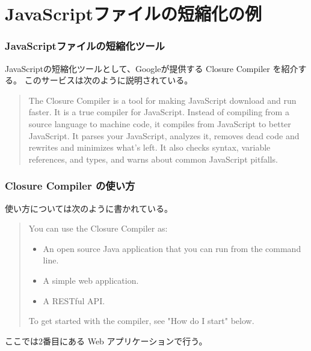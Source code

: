 \section{JavaScriptファイルの短縮化の例}
\begin{frame}[containsverbatim]
 \frametitle{JavaScriptファイルの短縮化ツール}
 JavaScriptの短縮化ツールとして、Googleが提供する
 Closure Compiler を紹介する。
 このサービスは次のように説明されている。
\begin{quotation}
 The Closure Compiler is a tool for making JavaScript download and run
 faster. It is a true compiler for JavaScript. Instead of compiling from
 a source language to machine code, it compiles from JavaScript to
 better JavaScript. It parses your JavaScript, analyzes it, removes dead
 code and rewrites and minimizes what's left. It also checks syntax,
 variable references, and types, and warns about common JavaScript
 pitfalls. 
\end{quotation}
\end{frame}
\begin{frame}[containsverbatim]
\frametitle{Closure Compiler の使い方}
使い方については次のように書かれている。
\begin{quotation}
 You can use the Closure Compiler as:

\begin{itemize}
 \item An open source Java application that you can run from the command
			 line.
 \item A simple web application.
 \item A RESTful API.
\end{itemize}
To get started with the compiler, see "How do I start" below.
\end{quotation}
ここでは2番目にある Web アプリケーションで行う。
\end{frame}

